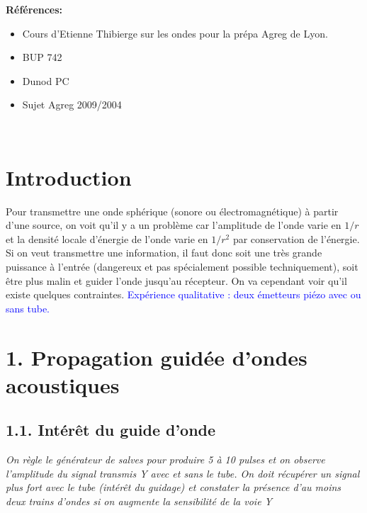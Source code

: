\documentclass[french, a4paper, 10pt, twocolumn, landscape]{article}
\begin{document}
\noindent\textbf{\large Références:} \medskip
\begin{itemize}
	\item Cours d’Etienne Thibierge sur les ondes pour la prépa Agreg de Lyon.
	\item BUP 742
	\item Dunod PC
	\item Sujet Agreg 2009/2004
\end{itemize}

\hrulefill\\

\section*{Introduction}

Pour transmettre une onde sphérique (sonore ou électromagnétique) à partir d'une source, on voit qu'il y a un problème car l'amplitude de l'onde varie en $1/r$ et la densité locale d'énergie de l'onde varie en $1/r^2$ par conservation de l'énergie. Si on veut transmettre une information, il faut donc soit une très grande puissance à l'entrée (dangereux et pas spécialement possible techniquement), soit être plus malin et guider l'onde jusqu'au récepteur. On va cependant voir qu'il existe quelques contraintes.
\textcolor{blue}{Expérience qualitative : deux émetteurs piézo avec ou sans tube.}

\section*{1. Propagation guidée d'ondes acoustiques}
\subsection*{1.1. Intérêt du guide d'onde}

\textit{On règle le générateur de salves pour produire 5 à 10 pulses et on observe l'amplitude du signal
transmis Y avec et sans le tube. On doit récupérer un signal plus fort avec le tube (intérêt du guidage)
et constater la présence d’au moins deux trains d’ondes si on augmente la sensibilité de la voie Y}

\end{document}
